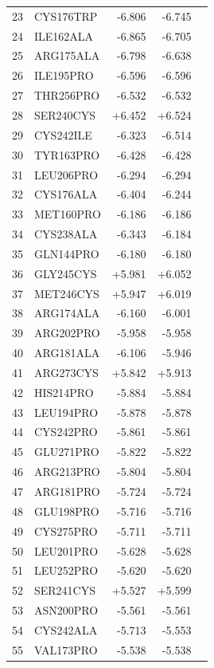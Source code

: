 \begin{longtable}{r l r r c}
23 & CYS176TRP & -6.806 & -6.745 &  \\
24 & ILE162ALA & -6.865 & -6.705 &  \\
25 & ARG175ALA & -6.798 & -6.638 &  \\
26 & ILE195PRO & -6.596 & -6.596 &  \\
27 & THR256PRO & -6.532 & -6.532 &  \\
28 & SER240CYS & +6.452 & +6.524 &  \\
29 & CYS242ILE & -6.323 & -6.514 &  \\
30 & TYR163PRO & -6.428 & -6.428 &  \\
31 & LEU206PRO & -6.294 & -6.294 &  \\
32 & CYS176ALA & -6.404 & -6.244 &  \\
33 & MET160PRO & -6.186 & -6.186 &  \\
34 & CYS238ALA & -6.343 & -6.184 &  \\
35 & GLN144PRO & -6.180 & -6.180 &  \\
36 & GLY245CYS & +5.981 & +6.052 &  \\
37 & MET246CYS & +5.947 & +6.019 &  \\
38 & ARG174ALA & -6.160 & -6.001 &  \\
39 & ARG202PRO & -5.958 & -5.958 &  \\
40 & ARG181ALA & -6.106 & -5.946 &  \\
41 & ARG273CYS & +5.842 & +5.913 &  \\
42 & HIS214PRO & -5.884 & -5.884 &  \\
43 & LEU194PRO & -5.878 & -5.878 &  \\
44 & CYS242PRO & -5.861 & -5.861 &  \\
45 & GLU271PRO & -5.822 & -5.822 &  \\
46 & ARG213PRO & -5.804 & -5.804 &  \\
47 & ARG181PRO & -5.724 & -5.724 &  \\
48 & GLU198PRO & -5.716 & -5.716 &  \\
49 & CYS275PRO & -5.711 & -5.711 &  \\
50 & LEU201PRO & -5.628 & -5.628 &  \\
51 & LEU252PRO & -5.620 & -5.620 &  \\
52 & SER241CYS & +5.527 & +5.599 &  \\
53 & ASN200PRO & -5.561 & -5.561 &  \\
54 & CYS242ALA & -5.713 & -5.553 &  \\
55 & VAL173PRO & -5.538 & -5.538 &  \\

\end{longtable}
